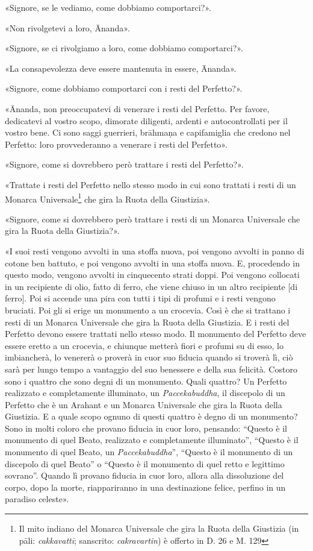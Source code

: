 «Signore, se le vediamo, come dobbiamo comportarci?».

«Non rivolgetevi a loro, Ānanda».

«Signore, se ci rivolgiamo a loro, come dobbiamo comportarci?».

«La consapevolezza deve essere mantenuta in essere, Ānanda».

«Signore, come dobbiamo comportarci con i resti del Perfetto?».

«Ānanda, non preoccupatevi di venerare i resti del Perfetto. Per favore,
dedicatevi al vostro scopo, dimorate diligenti, ardenti e autocontrollati per il
vostro bene. Ci sono saggi guerrieri, brāhmaṇa e capifamiglia che credono nel
Perfetto: loro provvederanno a venerare i resti del Perfetto».

«Signore, come si dovrebbero però trattare i resti del Perfetto?».

«Trattate i resti del Perfetto nello stesso modo in cui sono trattati i resti di
un Monarca Universale\footnote{Il mito indiano del Monarca Universale che gira
  la Ruota della Giustizia (in pāli: \emph{cakkavattī}; sanscrito:
  \emph{cakravartin}) è offerto in D. 26 e M. 129} che gira la Ruota della
Giustizia».

«Signore, come si dovrebbero però trattare i resti di un Monarca Universale che
gira la Ruota della Giustizia?».

«I suoi resti vengono avvolti in una stoffa nuova, poi vengono avvolti in panno
di cotone ben battuto, e poi vengono avvolti in una stoffa nuova. E, procedendo
in questo modo, vengono avvolti in cinquecento strati doppi. Poi vengono
collocati in un recipiente di olio, fatto di ferro, che viene chiuso in un altro
recipiente [di ferro]. Poi si accende una pira con tutti i tipi di profumi e i
resti vengono bruciati. Poi gli si erige un monumento a un crocevia. Così è che
si trattano i resti di un Monarca Universale che gira la Ruota della Giustizia.
E i resti del Perfetto devono essere trattati nello stesso modo. Il monumento
del Perfetto deve essere eretto a un crocevia, e chiunque metterà fiori e
profumi su di esso, lo imbiancherà, lo venererà o proverà in cuor suo fiducia
quando si troverà lì, ciò sarà per lungo tempo a vantaggio del suo benessere e
della sua felicità. Costoro sono i quattro che sono degni di un monumento. Quali
quattro? Un Perfetto realizzato e completamente illuminato, un
\emph{Paccekabuddha}, il discepolo di un Perfetto che è un Arahant e un Monarca
Universale che gira la Ruota della Giustizia. E a quale scopo ognuno di questi
quattro è degno di un monumento? Sono in molti coloro che provano fiducia in
cuor loro, pensando: “Questo è il monumento di quel Beato, realizzato e
completamente illuminato”, “Questo è il monumento di quel Beato, un
\emph{Paccekabuddha}”, “Questo è il monumento di un discepolo di quel Beato” o
“Questo è il monumento di quel retto e legittimo sovrano”. Quando lì provano
fiducia in cuor loro, allora alla dissoluzione del corpo, dopo la morte,
riappariranno in una destinazione felice, perfino in un paradiso celeste».

